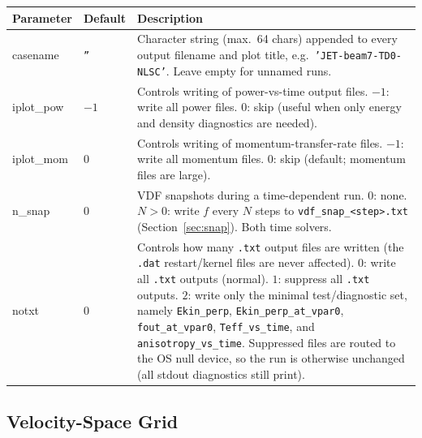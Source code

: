 \documentclass[11pt,a4paper]{article}
\begin{document}
\begin{longtable}{>{\ttfamily}p{3.2cm} p{1.5cm} p{9cm}}
\toprule
\normalfont Parameter & Default & Description \\
\midrule
\endhead
\bottomrule
\endlastfoot

casename & \texttt{''} &
  Character string (max.\ 64 chars) appended to every output filename and
  plot title, e.g.\ \texttt{'JET-beam7-TD0-NLSC'}.  Leave empty for
  unnamed runs. \\[4pt]

iplot\_pow & $-1$ &
  Controls writing of power-vs-time output files.
  $-1$: write all power files.
  $0$: skip (useful when only energy and density diagnostics are needed). \\[4pt]

iplot\_mom & $0$ &
  Controls writing of momentum-transfer-rate files.
  $-1$: write all momentum files.
  $0$: skip (default; momentum files are large). \\[4pt]

n\_snap & $0$ &
  VDF snapshots during a time-dependent run.
  $0$: none.
  $N > 0$: write $f$ every $N$ steps to \texttt{vdf\_snap\_<step>.txt}
  (Section~\ref{sec:snap}).  Both time solvers. \\[4pt]

notxt & $0$ &
  Controls how many \texttt{.txt} output files are written (the \texttt{.dat}
  restart/kernel files are never affected).
  $0$: write all \texttt{.txt} outputs (normal).
  $1$: suppress all \texttt{.txt} outputs.
  $2$: write only the minimal test/diagnostic set, namely
  \texttt{Ekin\_perp}, \texttt{Ekin\_perp\_at\_vpar0}, \texttt{fout\_at\_vpar0},
  \texttt{Teff\_vs\_time}, and \texttt{anisotropy\_vs\_time}.
  Suppressed files are routed to the OS null device, so the run is otherwise
  unchanged (all stdout diagnostics still print). \\[4pt]

\end{longtable}

\subsection{Velocity-Space Grid}
\end{document}

